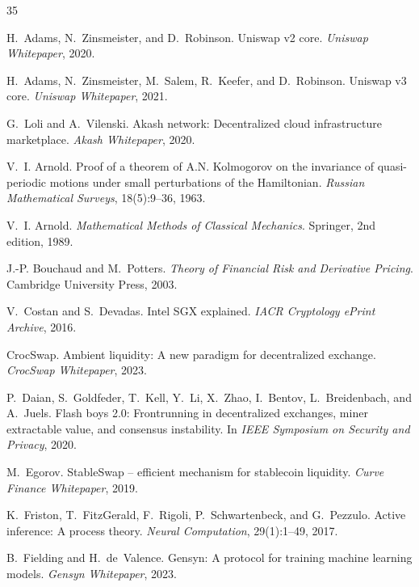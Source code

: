 
\begin{thebibliography}{35}

H.~Adams, N.~Zinsmeister, and D.~Robinson.
\newblock Uniswap v2 core.
\newblock \emph{Uniswap Whitepaper}, 2020.

H.~Adams, N.~Zinsmeister, M.~Salem, R.~Keefer, and D.~Robinson.
\newblock Uniswap v3 core.
\newblock \emph{Uniswap Whitepaper}, 2021.

G.~Loli and A.~Vilenski.
\newblock Akash network: Decentralized cloud infrastructure marketplace.
\newblock \emph{Akash Whitepaper}, 2020.

V.~I. Arnold.
\newblock Proof of a theorem of {A.N. Kolmogorov} on the invariance of quasi-periodic motions under small perturbations of the {Hamiltonian}.
\newblock \emph{Russian Mathematical Surveys}, 18(5):9--36, 1963.

V.~I. Arnold.
\newblock \emph{Mathematical Methods of Classical Mechanics}.
\newblock Springer, 2nd edition, 1989.

J.-P. Bouchaud and M.~Potters.
\newblock \emph{Theory of Financial Risk and Derivative Pricing}.
\newblock Cambridge University Press, 2003.

V.~Costan and S.~Devadas.
\newblock Intel {SGX} explained.
\newblock \emph{IACR Cryptology ePrint Archive}, 2016.

CrocSwap.
\newblock Ambient liquidity: A new paradigm for decentralized exchange.
\newblock \emph{CrocSwap Whitepaper}, 2023.

P.~Daian, S.~Goldfeder, T.~Kell, Y.~Li, X.~Zhao, I.~Bentov, L.~Breidenbach, and A.~Juels.
\newblock Flash boys 2.0: Frontrunning in decentralized exchanges, miner extractable value, and consensus instability.
\newblock In \emph{IEEE Symposium on Security and Privacy}, 2020.

M.~Egorov.
\newblock StableSwap -- efficient mechanism for stablecoin liquidity.
\newblock \emph{Curve Finance Whitepaper}, 2019.

K.~Friston, T.~FitzGerald, F.~Rigoli, P.~Schwartenbeck, and G.~Pezzulo.
\newblock Active inference: A process theory.
\newblock \emph{Neural Computation}, 29(1):1--49, 2017.

B.~Fielding and H.~de~Valence.
\newblock Gensyn: A protocol for training machine learning models.
\newblock \emph{Gensyn Whitepaper}, 2023.


\end{thebibliography}
